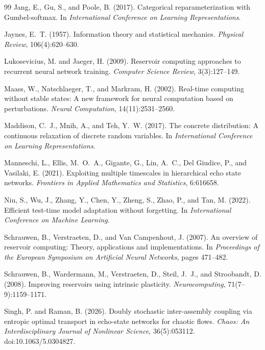 \documentclass[preprint,12pt,authoryear]{elsarticle}
\begin{document}
\begin{thebibliography}{99}
Jang, E., Gu, S., and Poole, B. (2017).
Categorical reparameterization with Gumbel-softmax.
In \emph{International Conference on Learning Representations}.

Jaynes, E.~T. (1957).
Information theory and statistical mechanics.
\emph{Physical Review}, 106(4):620--630.

Lukosevicius, M. and Jaeger, H. (2009).
Reservoir computing approaches to recurrent neural network training.
\emph{Computer Science Review}, 3(3):127--149.

Maass, W., Natschlaeger, T., and Markram, H. (2002).
Real-time computing without stable states: A new framework for neural computation based on perturbations.
\emph{Neural Computation}, 14(11):2531--2560.

Maddison, C.~J., Mnih, A., and Teh, Y.~W. (2017).
The concrete distribution: A continuous relaxation of discrete random variables.
In \emph{International Conference on Learning Representations}.

Manneschi, L., Ellis, M.~O.~A., Gigante, G., Lin, A.~C., Del Giudice, P., and Vasilaki, E. (2021).
Exploiting multiple timescales in hierarchical echo state networks.
\emph{Frontiers in Applied Mathematics and Statistics}, 6:616658.

Niu, S., Wu, J., Zhang, Y., Chen, Y., Zheng, S., Zhao, P., and Tan, M. (2022).
Efficient test-time model adaptation without forgetting.
In \emph{International Conference on Machine Learning}.

Schrauwen, B., Verstraeten, D., and Van Campenhout, J. (2007).
An overview of reservoir computing: Theory, applications and implementations.
In \emph{Proceedings of the European Symposium on Artificial Neural Networks}, pages 471--482.

Schrauwen, B., Wardermann, M., Verstraeten, D., Steil, J.~J., and Stroobandt, D. (2008).
Improving reservoirs using intrinsic plasticity.
\emph{Neurocomputing}, 71(7--9):1159--1171.


Singh, P. and Raman, B. (2026).
Doubly stochastic inter-assembly coupling via entropic optimal transport in echo-state networks for chaotic flows.
\emph{Chaos: An Interdisciplinary Journal of Nonlinear Science}, 36(5):053112.
\newblock doi:10.1063/5.0304827.


\end{thebibliography}
\end{document}
